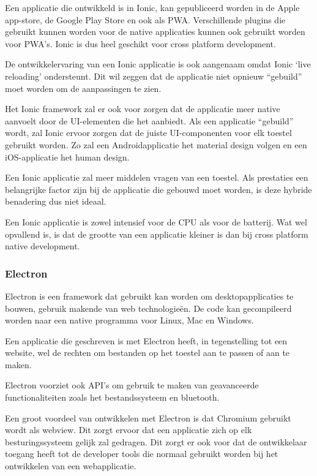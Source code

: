 		Een applicatie die ontwikkeld is in Ionic, kan gepubliceerd worden in de Apple app-store, de Google Play Store en ook als PWA. Verschillende plugins die gebruikt kunnen worden voor de native applicaties kunnen ook gebruikt worden voor PWA's. Ionic is dus heel geschikt voor cross platform development. 
		\autocite{Ionic2020a}
		
		De ontwikkelervaring van een Ionic applicatie is ook aangenaam omdat Ionic ‘live reloading’ ondersteunt. Dit wil zeggen dat de applicatie niet opnieuw “gebuild” moet worden om de aanpassingen te zien. 
		\autocite{Lucas2020}
		
		Het Ionic framework zal er ook voor zorgen dat de applicatie meer native aanvoelt door de UI-elementen die het aanbiedt. Als een applicatie “gebuild” wordt, zal Ionic ervoor zorgen dat de juiste UI-componenten voor elk toestel gebruikt worden. Zo zal een Androidapplicatie het material design volgen en een iOS-applicatie het human design. 
		
		Een Ionic applicatie zal meer middelen vragen van een toestel. Als prestaties een belangrijke factor zijn bij de applicatie die gebouwd moet worden, is deze hybride benadering dus niet ideaal.
		
		Een Ionic applicatie is zowel intensief voor de CPU als voor de batterij. Wat wel opvallend is, is dat de grootte van een applicatie kleiner is dan bij cross platform native development. 
		\autocite{Asp2017}	


	\subsubsection{Electron}
		Electron is een framework dat gebruikt kan worden om desktopapplicaties te bouwen, gebruik makende van web technologieën.  De code kan gecompileerd worden naar een native programma voor Linux, Mac en Windows.
		
		Een applicatie die geschreven is met Electron heeft, in tegenstelling tot een website, wel de rechten om bestanden op het toestel aan te passen of aan te maken.
		
		Electron voorziet ook API's om gebruik te maken van geavanceerde functionaliteiten zoals het bestandssysteem en bluetooth.
		
		Een groot voordeel van ontwikkelen met Electron is dat Chromium gebruikt wordt als webview. Dit zorgt ervoor dat een applicatie zich op elk besturingssysteem gelijk zal gedragen. Dit zorgt er ook voor dat de ontwikkelaar toegang heeft tot de developer tools die normaal gebruikt worden bij het ontwikkelen van een webapplicatie. 
		
